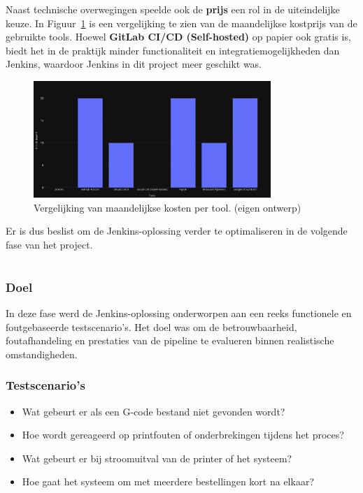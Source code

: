 \begin{enumerate}
Naast technische overwegingen speelde ook de \textbf{prijs} een rol in de uiteindelijke keuze. In Figuur~\ref{fig:kosten} is een vergelijking te zien van de maandelijkse kostprijs van de gebruikte tools. Hoewel \textbf{GitLab CI/CD (Self-hosted)} op papier ook gratis is, biedt het in de praktijk minder functionaliteit en integratiemogelijkheden dan Jenkins, waardoor Jenkins in dit project meer geschikt was.

\begin{figure}[H]
    \centering
    \includegraphics[width=0.8\textwidth]{foto's/Grafieken/KostenMaandelijks.png}
    \caption{Vergelijking van maandelijkse kosten per tool. (eigen ontwerp)}
    \label{fig:kosten}
\end{figure}

Er is dus beslist om de Jenkins-oplossing verder te optimaliseren in de volgende fase van het project.


\chapter{}%
\label{ch:test-en-prestatie}

\subsection{Doel}
In deze fase werd de Jenkins-oplossing onderworpen aan een reeks functionele en foutgebaseerde testscenario’s. Het doel was om de betrouwbaarheid, foutafhandeling en prestaties van de pipeline te evalueren binnen realistische omstandigheden.

\subsection{Testscenario’s}
\begin{itemize}
    \item Wat gebeurt er als een G-code bestand niet gevonden wordt?
    \item Hoe wordt gereageerd op printfouten of onderbrekingen tijdens het proces?
    \item Wat gebeurt er bij stroomuitval van de printer of het systeem?
    \item Hoe gaat het systeem om met meerdere bestellingen kort na elkaar?
\end{itemize}


\end{enumerate}
